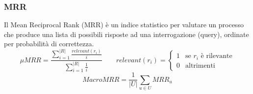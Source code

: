 \documentclass{beamer}
\begin{document}
\begin{frame}
	\frametitle{MRR}
	Il Mean Reciprocal Rank (MRR) è un indice statistico per valutare un processo che produce una lista di possibili risposte ad una interrogazione (query), ordinate per probabilità di correttezza.
		\begin{equation*}
			\mu MRR =\frac{\sum\limits_{i=1}^{|R|}{\frac{relevant(r_i)}{i}}}{\sum\limits_{i=1}^{|R|}{\frac{1}{i}}} \qquad relevant(r_i)=\begin{cases} 1 & \mbox{se }r_i\mbox{ è rilevante} \\ 0 & \mbox{altrimenti}
			\end{cases}
		\end{equation*}
		$$ MacroMRR =\frac{1}{|U|}\sum_{u\in U}{MRR_u} $$
\end{frame}
\end{document}
